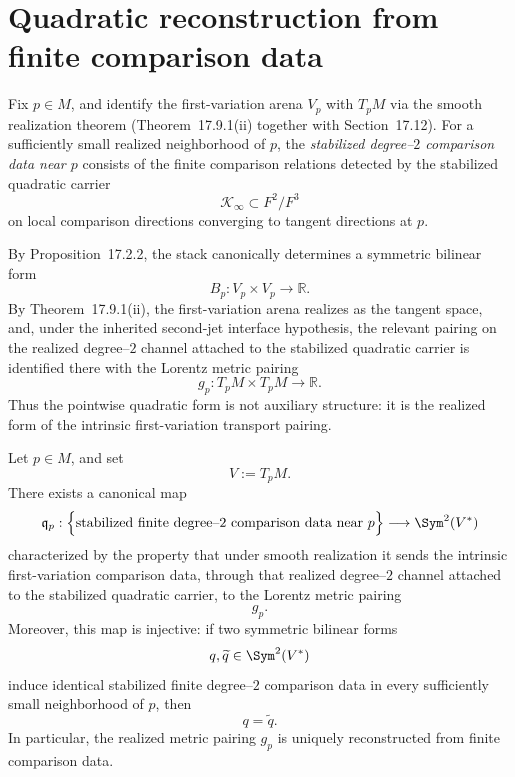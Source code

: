 \section{Quadratic reconstruction from finite comparison data}
\label{sec:einstein-quadratic-reconstruction}
\begin{definition}
	Fix \(p\in M\), and identify the first-variation arena \(V_p\) with
	\(T_pM\) via the smooth realization theorem
	\textup{(Theorem~17.9.1(ii) together with Section~17.12)}.
	For a sufficiently small realized neighborhood of \(p\), the
	\emph{stabilized degree--\(2\) comparison data near \(p\)} consists of the
	finite comparison relations detected by the stabilized quadratic carrier
	\[
		\mathcal K_\infty\subset F^2/F^3
	\]
	on local comparison directions converging to tangent directions at \(p\).
\end{definition}
\begin{remark}
	By Proposition~17.2.2, the stack canonically determines a symmetric
	bilinear form
	\[
		B_p:V_p\times V_p\to\mathbb R.
	\]
	By Theorem~17.9.1(ii), the first-variation arena realizes as the
	tangent space, and, under the inherited second-jet interface
	hypothesis, the relevant pairing on the realized degree--\(2\)
	channel attached to the stabilized quadratic carrier is identified
	there with the Lorentz metric pairing
	\[
		g_p:T_pM\times T_pM\to\mathbb R.
	\]
	Thus the pointwise quadratic form is not auxiliary structure: it is the
	realized form of the intrinsic first-variation transport pairing.
\end{remark}
\begin{theorem}
	\label{thm:einstein-quadratic-reconstruction}
	Let \(p\in M\), and set
	\[
		V:=T_pM.
	\]
	There exists a canonical map
	\[
		\mathfrak q_p:
		\Bigl\{
		\text{stabilized finite degree--\(2\) comparison data near }p
		\Bigr\}
		\longrightarrow
		\Sym^2(V^*)
	\]
	characterized by the property that under smooth realization it sends
	the intrinsic first-variation comparison data, through that realized
	degree--\(2\) channel attached to the stabilized quadratic carrier,
	to the Lorentz metric pairing
	\[
		g_p.
	\]
	Moreover, this map is injective: if two symmetric bilinear forms
	\[
		q,\widetilde q\in \Sym^2(V^*)
	\]
	induce identical stabilized finite degree--\(2\) comparison data in every
	sufficiently small neighborhood of \(p\), then
	\[
		q=\widetilde q.
	\]
	In particular, the realized metric pairing \(g_p\) is uniquely
	reconstructed from finite comparison data.
\end{theorem}
